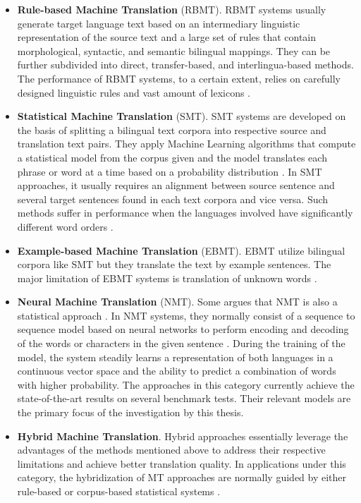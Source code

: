 \begin{itemize}
\item \textbf{Rule-based Machine Translation} (RBMT). RBMT systems usually generate target language text based on an intermediary linguistic representation of the source text and a large set of rules that contain morphological, syntactic, and semantic bilingual mappings. They can be further subdivided into direct, transfer-based, and interlingua-based methods. The performance of RBMT systems, to a certain extent, relies on carefully designed linguistic rules and vast amount of lexicons \cite{Moussallem2017}.
\item \textbf{Statistical Machine Translation} (SMT). SMT systems are developed on the basis of splitting a bilingual text corpora into respective source and translation text pairs. They apply Machine Learning algorithms that compute a statistical model from the corpus given and the model translates each phrase or word at a time based on a probability distribution \cite{Moussallem2017}. In SMT approaches, it usually requires an alignment between source sentence and several target sentences found in each text corpora and vice versa. Such methods suffer in performance when the languages involved have significantly different word orders \cite{okpor2014machine}.
\item \textbf{Example-based Machine Translation} (EBMT). EBMT utilize bilingual corpora like SMT but they translate the text by example sentences. The major limitation of EBMT systems is translation of unknown words \cite{Moussallem2017}. 
\item \textbf{Neural Machine Translation} (NMT). Some argues that NMT is also a statistical approach \cite{Moussallem2017}. In NMT systems, they normally consist of a sequence to sequence model based on neural networks to perform encoding and decoding of the words or characters in the given sentence \cite{Moussallem2017}. During the training of the model, the system steadily learns a representation of both languages in a continuous vector space and the ability to predict a combination of words with higher probability. The approaches in this category currently achieve the state-of-the-art results on several benchmark tests. Their relevant models are the primary focus of the investigation by this thesis.
\item \textbf{Hybrid Machine Translation}. Hybrid approaches essentially leverage the advantages of the methods mentioned above to address their respective limitations and achieve better translation quality. In applications under this category, the hybridization of MT approaches are normally guided by either rule-based or corpus-based statistical systems \cite{costa2015latest}.
\end{itemize}

